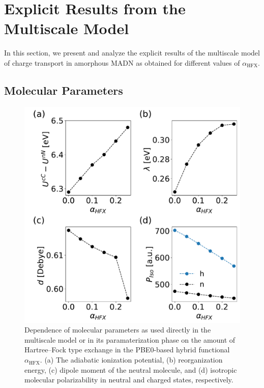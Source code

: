 \documentclass[%
 reprint,
superscriptaddress,
 amsmath,amssymb,
 aps,
prb,
floatfix
]{revtex4-2}
\begin{document}
\section{Explicit Results from the Multiscale Model}
\label{sec:MSMresults}
In this section, we present and analyze the explicit results of the multiscale model of charge transport in amorphous MADN as obtained for different values of $\alpha_\text{HFX}$.



\subsection{Molecular Parameters}

\begin{figure}[tbp]
    \centering
    \includegraphics[width=\linewidth]{fig2.pdf}
    \caption{Dependence of molecular parameters as used directly in the multiscale model or in its paramaterization phase on the amount of Hartree--Fock type exchange in the PBE0-based hybrid functional $\alpha_\text{HFX}$. (a) The adiabatic ionization potential, (b) reorganization energy, (c) dipole moment of the neutral molecule, and (d) isotropic molecular polarizability in neutral and charged states, respectively.}
    \label{fig:autogen_MADN}
\end{figure}
\end{document}
